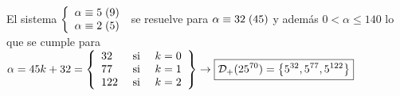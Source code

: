 El sistema
$\llave{l}{
		\congruencia{\alpha}{5}{9} \\
		\congruencia{\alpha}{2}{5}
	}$
se resuelve para $\congruencia{\alpha}{32}{45}$ y además $0<\alpha \leq 140$ lo que se
cumple para $\alpha = 45k + 32 =
	\llaves{lcr}{
		32  &  \text{ si } & k = 0\\
		77  &  \text{ si } & k = 1 \\
		122 &  \text{ si } & k = 2
	} \to \boxed{\divsetP{25^{70}}{ 5^{32}, 5^{77}, 5^{122} }}  $



